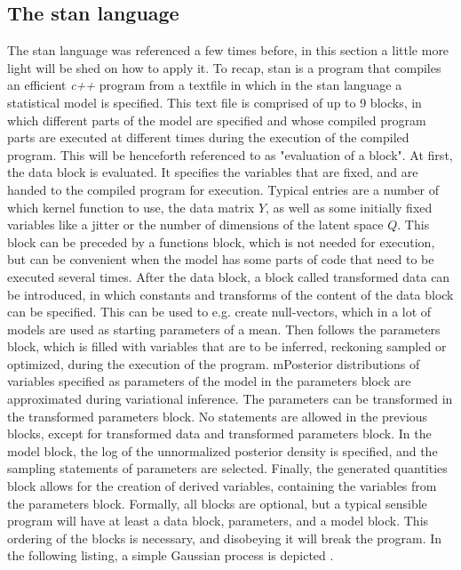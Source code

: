 \subsection{The stan language}
The stan language was referenced a few times before, in this section a little more light will be shed on how to apply it. To recap, stan \cite{stan_overview} is a program that compiles an efficient \textit{c++} program from a textfile in which in the stan language a statistical model is specified. This text file is comprised of up to 9 blocks, in which different parts of the model are specified and whose compiled program parts are executed at different times during the execution of the compiled program. This will be henceforth referenced to as "evaluation of a block". At first, the data block is evaluated. It specifies the variables that are fixed, and are handed to the compiled program for execution. Typical entries are a number of which kernel function to use, the data matrix $Y$, as well as some initially fixed variables like a jitter or the number of dimensions of the latent space $Q$. This block can be preceded by a functions block, which is not needed for execution, but can be convenient when the model has some parts of code that need to be executed several times. After the data block, a block called transformed data can be introduced, in which constants and transforms of the content of the data block can be specified. This can be used to e.g. create null-vectors, which in a lot of models are used as starting parameters of a mean. Then follows the parameters block, which is filled with variables that are to be inferred, reckoning sampled or optimized, during the execution of the program. mPosterior distributions of variables specified as parameters of the model in the parameters block are approximated during variational inference. The parameters can be transformed in the transformed parameters block. No statements are allowed in the previous blocks, except for transformed data and transformed parameters block. In the model block, the log of the unnormalized posterior density is specified, and the sampling statements of parameters are selected. Finally, the generated quantities block allows for the creation of derived variables, containing the variables from the parameters block. \newline \newline
Formally, all blocks are optional, but a typical sensible program will have at least a data block, parameters, and a model block. This ordering of the blocks is necessary, and disobeying it will break the program. In the following listing, a simple Gaussian process is depicted \cite{stan_manual}.
